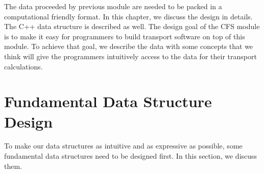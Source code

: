 The data proceeded by previous module are needed to be packed in a computational friendly format. In this chapter, we discuss the design in details. The C++ data structure is described as well. The design goal of the CFS module is to make it easy for programmers to build transport software on top of this module. To achieve that goal, we describe the data with some concepts that we think will give the programmers intuitively access to the data for their transport calculations. 

\section{Fundamental Data Structure Design}
To make our data structures as intuitive and as expressive as possible, some fundamental data structures need to be designed first. In this section, we discuss them.

